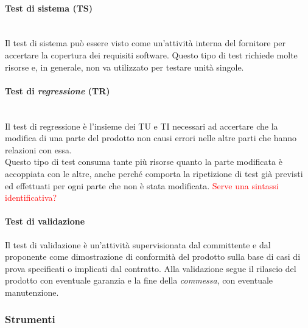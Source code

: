 		\paragraph{\textbf{Test di sistema (TS)}}
		~\\Il test di sistema può essere visto come un'attività interna del fornitore
		per accertare la copertura dei requisiti software.
		\newline{}Questo tipo di test richiede molte risorse e, in generale, non va utilizzato per testare
		unità singole.
		\paragraph{\textbf{Test di \emph{regressione}} \textbf{(TR)}}
		~\\Il test di regressione è l'insieme dei TU e TI necessari ad accertare che la modifica
		di una parte del prodotto non causi errori nelle altre parti che hanno relazioni con essa.
		\\Questo tipo di test consuma tante più risorse quanto la parte modificata è accoppiata con le altre, 
		anche perché comporta la ripetizione di test già previsti ed effettuati per ogni parte che non è 
		stata modificata.
		\textcolor{red}{Serve una sintassi identificativa?}
		\paragraph{\textbf{Test di validazione}}
		Il test di validazione è un'attività supervisionata dal committente e dal proponente come dimostrazione di conformità del prodotto sulla base 
		di casi di prova specificati o implicati dal contratto.
		Alla validazione segue il rilascio del prodotto con eventuale garanzia e la fine della
		\emph{commessa},	con eventuale manutenzione.
	
	\subsubsection{Strumenti}
